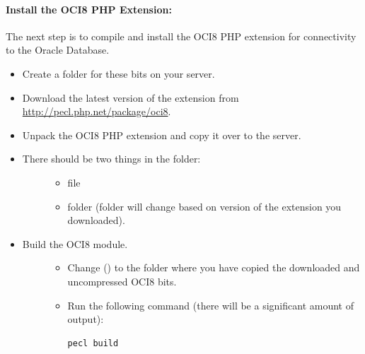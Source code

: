 \documentclass[letterpaper,10pt,english]{sphinxmanual}
\begin{document}
\paragraph{Install the OCI8 PHP Extension:}
\label{enterprise_installation/oracle_db_configuration:install-the-oci8-php-extension}
The next step is to compile and install the OCI8 PHP extension for connectivity to the Oracle Database.
\begin{itemize}
\item {} 
Create a folder for these bits on your server.

\item {} 
Download the latest version of the extension from \href{http://pecl.php.net/package/oci8}{http://pecl.php.net/package/oci8}.

\item {} 
Unpack the OCI8 PHP extension and copy it over to the server.

\item {} \begin{description}
\item[{There should be two things in the folder:}] \leavevmode\begin{itemize}
\item {} 
 file

\item {} 
 folder (folder will change based on version of the extension you downloaded).

\end{itemize}

\end{description}

\item {} \begin{description}
\item[{Build the OCI8 module.}] \leavevmode\begin{itemize}
\item {} 
Change () to the folder where you have copied the downloaded and uncompressed OCI8 bits.

\item {} 
Run the following command (there will be a significant amount of output):

\begin{Verbatim}[commandchars=\\\{\}]
pecl build
\end{Verbatim}

\end{itemize}


\end{description}
\end{itemize}
\end{document}

